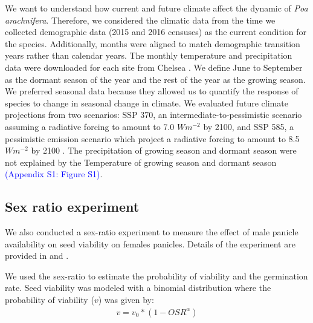 \documentclass[11pt]{article}
\begin{document}
We want to understand how current and future climate affect the dynamic of \textit{Poa arachnifera}. 
Therefore, we considered the climatic data from the time we collected demographic data (2015 and 2016 censuses) as the current condition for the species.
Additionally, months were aligned to match demographic transition years rather than calendar years.
The monthly temperature and precipitation data were downloaded for each site from Chelsea \citep{karger2017climatologies}. 
We define June to September as the dormant season of the year and the rest of the year as the growing season. 
We preferred seasonal data because they allowed us to quantify the response of species to change in seasonal change in climate. 
We evaluated future climate projections from two scenarios: SSP 370, an intermediate-to-pessimistic scenario assuming a radiative forcing to amount to 7.0 $W m^{-2}$ by 2100, and SSP 585, a pessimistic emission scenario which project a radiative forcing to amount to 8.5 $W m^{-2}$ by 2100 \citep{o2017roads,brun2022global}.
The precipitation of growing season and dormant season were not explained by the Temperature of growing season and dormant season \textcolor{blue}{(Appendix S1: Figure S1)}.
\subsection*{Sex ratio experiment}
We also conducted a sex-ratio experiment to measure the effect of male panicle availability on seed viability on females panicles. Details of the experiment are provided in \cite{compagnoni2017can} and \cite{miller2022two}. 

We used the sex-ratio to estimate the probability of viability and the germination rate. 
Seed viability was modeled with a binomial distribution where the probability of viability ($v$) was given by:
\begin{align}\label{eq:viab_fn}
v = v_{0} * (1 - OSR^{\alpha})
\end{align}
\end{document}
